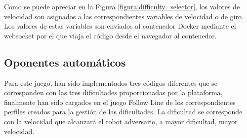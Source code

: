 \documentclass[a4paper, 12pt]{book}
\begin{document}

Como se puede apreciar en la Figura \ref{figura:difficulty_selector}, los valores de velocidad son asignados a las correspondientes variables de velocidad o de giro. Los valores de estas variables son enviados al contenedor Docker mediante el websocket por el que viaja el código desde el navegador al contenedor.

\subsection{Oponentes automáticos}

Para este juego, han sido implementados tres códigos diferentes que se corresponden con las tres dificultades proporcionadas por la plataforma, finalmente han sido cargados en el juego Follow Line de los correspondientes perfiles creados para la gestión de las dificultades. La dificultad se corresponde con la velocidad que alcanzará el robot adversario, a mayor dificultad, mayor velocidad.
\end{document}
